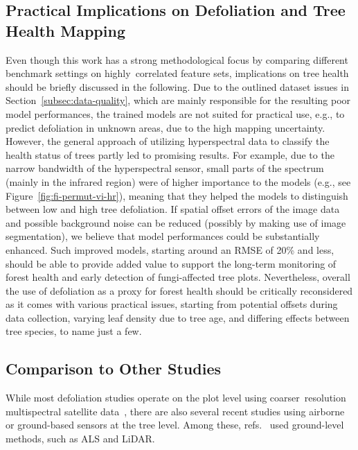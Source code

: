 \documentclass[remotesensing,article,accept,moreauthors,pdftex]{Definitions/mdpi}
\begin{document}
\begin{paracol}{2}
\subsection{Practical Implications on Defoliation and Tree Health Mapping}
Even though this work has a strong methodological focus by comparing different benchmark settings on highly\ correlated feature sets, implications on tree health should be briefly discussed in the following.
Due to the outlined dataset issues in Section~\ref{subsec:data-quality}, which are mainly responsible for the resulting poor model performances, the trained models are not suited for practical use, e.g., to predict defoliation in unknown areas, due to the high mapping uncertainty.
However, the general approach of utilizing hyperspectral data to classify the health status of trees partly led to promising results.
For example, due to the narrow bandwidth of the hyperspectral sensor, small parts of the spectrum (mainly in the infrared region) were of higher importance to the models (e.g., see Figure~\ref{fig:fi-permut-vi-hr}), meaning that they helped the models to distinguish between low and high tree defoliation.
If spatial offset errors of the image data and possible background noise can be reduced (possibly by making use of image segmentation), we believe that model performances could be substantially enhanced.
Such improved models, starting around an RMSE of 20\% and less, should be able to provide added value to support the long-term monitoring of forest health and early detection of fungi-affected tree plots.
Nevertheless, overall the use of defoliation as a proxy for forest health should be critically reconsidered as it comes with various practical issues, starting from potential offsets during data collection, varying leaf density due to tree age, and differing effects between tree species, to  name just a few.

\subsection{Comparison to Other Studies}

While most defoliation studies operate on the plot level using coarser\ resolution multispectral satellite data~\cite{townsend2012, debeurs2008, rengarajan2016}, there are also several recent studies using airborne or ground-based sensors at the tree level.
Among these, refs.~\cite{meng2018, kalin2019} used ground-level methods, such as \ac{ALS} and \ac{LiDAR}.


\end{paracol}
\end{document}
